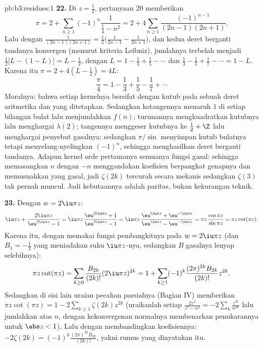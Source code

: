 \begin{solution}{pb:b3:residues:1}
\textbf{22.} Di $z = \frac12$, pertanyaan 20 memberikan
\[
\pi = 2 + \sum_{n\geq1}(-1)^n\frac{1}{\frac14 - n^2}
= 2 + 4\sum_{n\geq1}\frac{(-1)^{n-1}}{(2n-1)(2n+1)} .
\]
Lalu dengan $\frac1{(2n-1)(2n+1)} = \frac12\bigl(\frac1{2n-1} -
\frac1{2n+1}\bigr)$, dan kedua deret berganti tandanya konvergen
(menurut kriteria Leibniz), jumlahnya terbelah menjadi $\frac12\bigl[L -
(1 - L)\bigr] = L - \frac12$, dengan $L = 1 - \frac13 +
\frac15 - \cdots$ dan $\frac13 - \frac15 + \frac17 - \cdots
= 1 - L$. Karena itu $\pi = 2 + 4(L - \frac12) = 4L$:
\[
\frac\pi4 = 1 - \frac13 + \frac15 - \frac17 + \cdots
\]
Moralnya: bahwa setiap kernelnya bersifat  dengan kutub pada sebuah
deret aritmetika dan  yang ditetapkan. Sedangkan
kotangennya menaruh  $1$ di setiap bilangan bulat lalu menjumlahkan
$f(n)$; turunannya mengkuadratkan kutubnya lalu menghargai
$\lambda(2)$; tangennya menggeser kutubnya ke $\frac12 + \Z$
lalu menghargai penyebut gasalnya; sedangkan $\pi/\sin$ menyimpan
kutub bulatnya tetapi menyelang-nyelingkan  $(-1)^n$, sehingga
menghasilkan deret berganti tandanya. Adapun kernel orde pertamanya semuanya
fungsi gasal: sehingga memasangkan $n$ dengan $-n$ menggandakan koefisien
berpangkat genapnya dan memusnahkan yang gasal, jadi $\zeta(2k)$
tercurah secara mekanis sedangkan $\zeta(3)$ tak pernah muncul. Jadi
kebutaannya adalah paritas, bukan kekurangan teknik.

\textbf{23.} Dengan $w = 2\iu\pi z$:
\[
\iu\pi z + \frac{2\iu\pi z}{\eu^{2\iu\pi z} - 1}
= \iu\pi z\,\frac{\eu^{2\iu\pi z} + 1}{\eu^{2\iu\pi z} - 1}
= \iu\pi z\,\frac{\eu^{\iu\pi z} +
\eu^{-\iu\pi z}}{\eu^{\iu\pi z} - \eu^{-\iu\pi z}}
= \pi z\,\frac{\cos\pi z}{\sin\pi z} = \pi z\cot(\pi z) .
\]
Karena itu, dengan memakai fungsi pembangkitnya pada $w = 2\iu\pi z$ (dan
$B_1 = -\frac12$ yang meniadakan suku $\iu\pi z$-nya, sedangkan $B$ gasalnya
lenyap selebihnya):
\[
\pi z\cot(\pi z) = \sum_{k\geq0}\frac{B_{2k}}{(2k)!}
(2\iu\pi z)^{2k}
= 1 + \sum_{k\geq1}(-1)^k\frac{(2\pi)^{2k}B_{2k}}{(2k)!}
z^{2k} .
\]
Sedangkan di sisi lain uraian pecahan parsialnya (Bagian IV)
memberikan $\pi z\cot(\pi z) = 1 - 2\sum_{k\geq1}\zeta(2k)z^{2k}$
(uraikanlah setiap $\frac{2z^2}{z^2 - n^2} =
-2\sum_k\frac{z^{2k}}{n^{2k}}$ lalu jumlahkan atas $n$, dengan kekonvergenan
normalnya membenarkan penukarannya untuk $\abs z < 1$).
Lalu dengan membandingkan koefisiennya: $-2\zeta(2k) =
(-1)^k\frac{(2\pi)^{2k}B_{2k}}{(2k)!}$, yakni rumus yang dinyatakan itu.


\end{solution}
